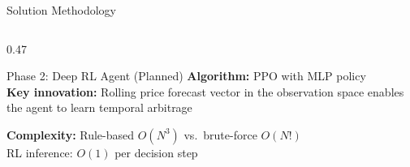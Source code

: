 \documentclass[aspectratio=169, 11pt]{beamer}
\begin{document}
\begin{frame}{Solution Methodology}
\begin{columns}[T]
\begin{column}{0.47\textwidth}
\begin{block}{Phase 2: Deep RL Agent (Planned)}
\vspace{0.5em}
\textbf{Algorithm:} PPO with MLP policy \\
\textbf{Key innovation:} Rolling price forecast vector in the observation space enables the agent to learn temporal arbitrage
\end{block}

\vspace{0.3em}
\textbf{Complexity:} Rule-based $O(N^3)$ vs.\ brute-force $O(N!)$ \\ RL inference: $O(1)$ per decision step

\end{column}
\end{columns}

\end{frame}

\end{document}
